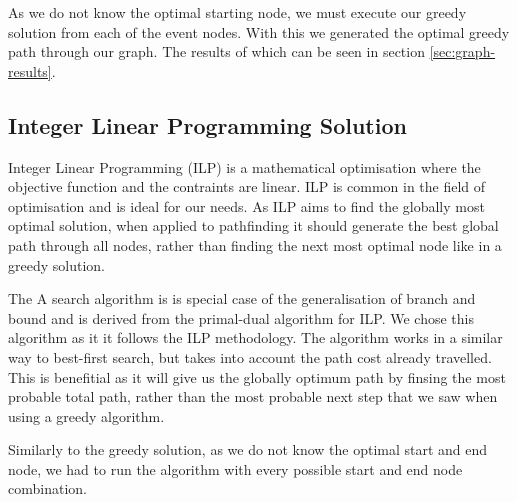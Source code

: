 \documentclass[bsc,frontabs,twoside,singlespacing,parskip,deptreport]{infthesis}     %
\begin{document}
As we do not know the optimal starting node, we must execute our greedy solution from each of the event nodes.
With this we generated the optimal greedy path through our graph. The results of which can be seen in section \ref{sec:graph-results}.

\subsection{Integer Linear Programming Solution}
Integer Linear Programming (ILP) is a mathematical optimisation where the objective function and the contraints are linear.
ILP is common in the field of optimisation and is ideal for our needs. As ILP aims to find the globally most optimal solution, when applied to pathfinding it
should generate the best global path through all nodes, rather than finding the next most optimal node like in a greedy solution.


The A\* search algorithm is is special case of the generalisation of branch and bound\cite{balas1983branch} and is derived from the primal-dual algorithm for ILP\cite{ye2012note}.
We chose this algorithm as it it follows the ILP methodology. The algorithm works in a similar way to best-first search, but takes into account the path cost already travelled.
This is benefitial as it will give us the globally optimum path by finsing the most probable total path, rather than the most probable next step that we saw when using a
greedy algorithm.

Similarly to the greedy solution, as we do not know the optimal start and end node, we had to run the algorithm with every possible start and end node combination.
\end{document}
